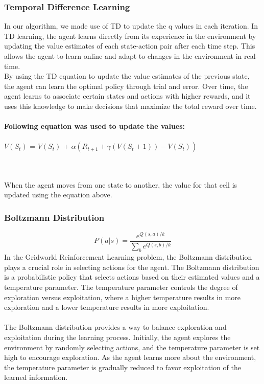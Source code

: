 \documentclass{article}
\begin{document}
\subsubsection{Temporal Difference Learning}
In our algorithm, we made use of TD to update the q values in each iteration. In TD learning, the agent learns directly from its experience in the environment by updating the value estimates of each state-action pair after each time step. This allows the agent to learn online and adapt to changes in the environment in real-time.
\\
By using the TD equation to update the value estimates of the previous state, the agent can learn the optimal policy through trial and error. Over time, the agent learns to associate certain states and actions with higher rewards, and it uses this knowledge to make decisions that maximize the total reward over time.
\\~\\
\textbf{Following equation was used to update the values: }
\\~\\
$V(S_{t})$ = $V(S_{t})$ + $\alpha(R_{t+1} + \gamma (V(S_{t}+1))-V(S_{t}))$

\\~\\
When the agent moves from one state to another, the value for that cell is updated using the equation above. 

\subsubsection{Boltzmann Distribution}

\begin{equation}
P(a|s) = \frac{e^{Q(s,a)/k}}{\sum_{b} e^{Q(s,b)/k}}
\end{equation}
In the Gridworld Reinforcement Learning problem, the Boltzmann distribution plays a crucial role in selecting actions for the agent. The Boltzmann distribution is a probabilistic policy that selects actions based on their estimated values and a temperature parameter. The temperature parameter controls the degree of exploration versus exploitation, where a higher temperature results in more exploration and a lower temperature results in more exploitation.
\\~\\
The Boltzmann distribution provides a way to balance exploration and exploitation during the learning process. Initially, the agent explores the environment by randomly selecting actions, and the temperature parameter is set high to encourage exploration. As the agent learns more about the environment, the temperature parameter is gradually reduced to favor exploitation of the learned information.
\end{document}
